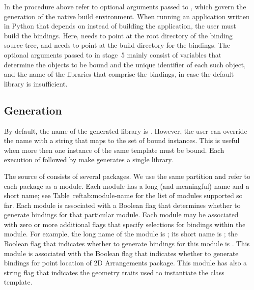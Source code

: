 In the procedure above  refer to optional
arguments passed to , which govern the generation
of the native build environment. When running an application written
in Python that depends on \cgal{} instead of building the application,
the user must build the bindings. Here, 
needs to point at the root directory of the binding source tree,
and  needs to point at the build directory for
the bindings. The optional arguments passed to 
in stage~5 mainly consist of variables that determine the objects
to be bound and the unique identifier of each such object, and the
name of the libraries that comprise the bindings, in case the default
library is insufficient.

\subsection{Generation}
\label{sec:bind:gen}
By default, the name of the generated library
is . However, the user can override the name
with a string that maps to the set of bound instances. This is useful
when more then one instance of the same template must be bound. Each
execution of  followed by make generates a single
library.
%

The source of \cgal{} consists of several packages.  We use the same
partition and refer to each package as a module. Each module has a
long (and meaningful) name and a short name; see
Table~ref{tab:module-name} for the list of modules supported so
far. Each module is associated with a \cmake{} Boolean flag that
determines whether to generate bindings for that particular
module. Each module may be associated with zero or more additional
flags that specify selections for bindings within the module. For
example, the long name of the \iiDArrangementsPackage{} module is
; its short name is ;
the Boolean flag that indicates whether to generate bindings for this
module is . This module
is associated with the Boolean flag
 that indicates
whether to generate bindings for point location of 2D Arrangements
package. This module has also a string flag
 that indicates the
geometry traits used to instantiate the 
class template.

